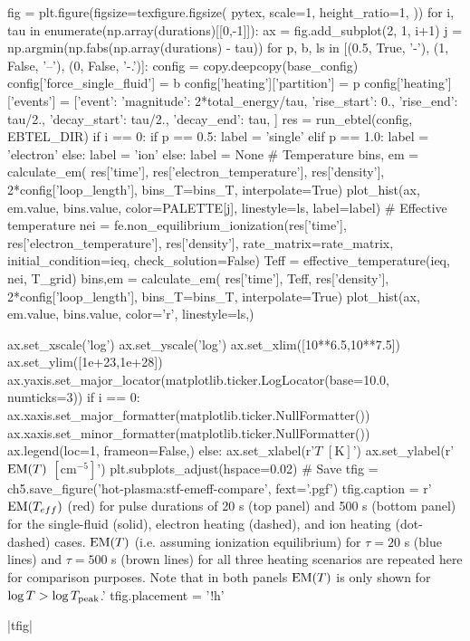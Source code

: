 \begin{pycode}[chapter5]
fig = plt.figure(figsize=texfigure.figsize(
    pytex,
    scale=1,
    height_ratio=1,
))
for i, tau in enumerate(np.array(durations)[[0,-1]]):
    ax = fig.add_subplot(2, 1, i+1)
    j = np.argmin(np.fabs(np.array(durations) - tau))
    for p, b, ls in [(0.5, True, '-'), (1, False, '--'), (0, False, '-.')]:
        config = copy.deepcopy(base_config)
        config['force_single_fluid'] = b
        config['heating']['partition'] = p
        config['heating']['events'] = [{'event': {
            'magnitude': 2*total_energy/tau,
            'rise_start': 0.,
            'rise_end': tau/2.,
            'decay_start': tau/2.,
            'decay_end': tau,
        }}]
        res = run_ebtel(config, EBTEL_DIR)
        if i == 0:
            if p == 0.5:
                label = 'single'
            elif p == 1.0:
                label = 'electron'
            else:
                label = 'ion'
        else:
            label = None
        # Temperature
        bins, em = calculate_em(
            res['time'],
            res['electron_temperature'],
            res['density'],
            2*config['loop_length'],
            bins_T=bins_T,
            interpolate=True)
        plot_hist(ax, em.value, bins.value, color=PALETTE[j], linestyle=ls, label=label)
        # Effective temperature
        nei = fe.non_equilibrium_ionization(res['time'], res['electron_temperature'], res['density'],
                                            rate_matrix=rate_matrix, initial_condition=ieq,
                                            check_solution=False)
        Teff = effective_temperature(ieq, nei, T_grid)
        bins,em = calculate_em(
            res['time'],
            Teff,
            res['density'],
            2*config['loop_length'],
            bins_T=bins_T,
            interpolate=True)
        plot_hist(ax, em.value, bins.value, color='r', linestyle=ls,)
    
    ax.set_xscale('log')
    ax.set_yscale('log')
    ax.set_xlim([10**6.5,10**7.5])
    ax.set_ylim([1e+23,1e+28])
    ax.yaxis.set_major_locator(matplotlib.ticker.LogLocator(base=10.0, numticks=3))
    if i == 0:
        ax.xaxis.set_major_formatter(matplotlib.ticker.NullFormatter())
        ax.xaxis.set_minor_formatter(matplotlib.ticker.NullFormatter())
        ax.legend(loc=1, frameon=False,)
    else:
        ax.set_xlabel(r'$T$ $[\si{\kelvin}]$')
    ax.set_ylabel(r'$\textup{EM}(T)$ $[\si{\cm\tothe{-5}}]$')
plt.subplots_adjust(hspace=0.02)
# Save
tfig = ch5.save_figure('hot-plasma:stf-emeff-compare', fext='.pgf')
tfig.caption = r'$\emd[T_{eff}]$ (red) for pulse durations of 20 s (top panel) and 500 s (bottom panel) for the single-fluid (solid), electron heating (dashed), and ion heating (dot-dashed) cases. $\emd[T]$ (i.e. assuming ionization equilibrium) for $\tau=20$ s (blue lines) and $\tau=500$ s (brown lines) for all three heating scenarios are repeated here for comparison purposes. Note that in both panels $\emd[T]$ is only shown for $\log{T}>\log{T_\textup{peak}}$.'
tfig.placement = '!h'
\end{pycode}
\py[chapter5]|tfig|

